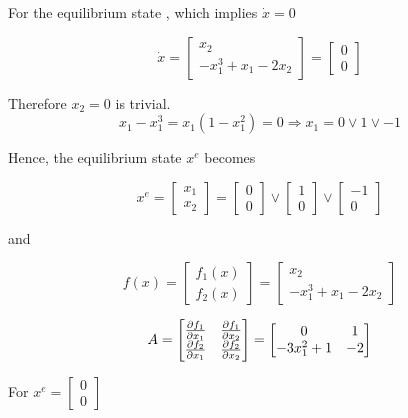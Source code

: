\documentclass[12pt,a4paper]{article}
\begin{document}
For the equilibrium state , which implies $\dot x = 0$

\[ \dot x = 
\begin{bmatrix}
x_2  \\ -x_1^3 + x_1 - 2x_2
\end{bmatrix} = \begin{bmatrix}
0 \\ 0
\end{bmatrix}
\]

Therefore $x_2 = 0$ is trivial.
\[
x_1 - x_1^3 = x_1 (1 - x_1^2) = 0 \Rightarrow x_1 = 0 \lor 1 \lor -1
\]

Hence, the equilibrium state $x^e$ becomes

\[
x^e = \begin{bmatrix}
	x_1 \\ x_2
\end{bmatrix} = \begin{bmatrix}
0 \\ 0 
\end{bmatrix} \lor \begin{bmatrix}
1 \\ 0 
\end{bmatrix} \lor \begin{bmatrix}
-1 \\ 0
\end{bmatrix}
 \]
 
 and
 
 \[
 f(x) = \begin{bmatrix}
 	f_1(x) \\ f_2(x)
 \end{bmatrix} = \begin{bmatrix}
 x_2 \\ -x_1^3 + x_1 - 2x_2
 \end{bmatrix}
 \]
 
 \[
 A = \begin{bmatrix}
 	{\partial f_1 \over \partial x_1} & {\partial f_1 \over \partial x_2} \\
 	{\partial f_2 \over \partial x_1} & {\partial f_2 \over \partial x_2}
 \end{bmatrix} = \begin{bmatrix}
 0 & 1 \\ -3x_1^2 + 1 & -2
 \end{bmatrix}
  \]
 
 For $x^e = \begin{bmatrix}
 	0 \\ 0
 \end{bmatrix}
 $
 
\end{document}
